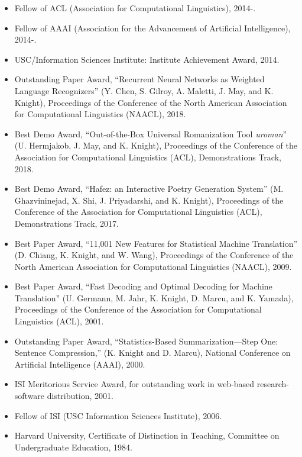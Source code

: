 
\begin{itemize}

\item Fellow of ACL (Association for Computational Linguistics), 2014-.

\item Fellow of AAAI (Association for the Advancement 
of Artificial Intelligence), 2014-.

\item USC/Information Sciences Institute: Institute Achievement Award, 2014.

\item Outstanding Paper Award,
``Recurrent Neural Networks as Weighted Language Recognizers'' (Y. Chen, S. Gilroy, A. Maletti, J. May, and K. Knight), Proceedings of the Conference of the North American Association for Computational Linguistics (NAACL), 2018. 

\item Best Demo Award,
``Out-of-the-Box Universal Romanization Tool {\em uroman}'' (U. Hermjakob,
J. May, and K. Knight),
Proceedings of the Conference of the 
Association for Computational Linguistics (ACL), Demonstrations Track, 2018.

\item Best Demo Award,
``Hafez: an Interactive Poetry Generation System'' (M. Ghazvininejad, X. Shi, 
J. Priyadarshi, and K. Knight), 
Proceedings of the Conference of the 
Association for Computational Linguistics (ACL), Demonstrations Track, 2017.

\item Best Paper Award,
``11,001 New Features for Statistical Machine Translation''
(D. Chiang, K. Knight, and W. Wang),
Proceedings of the Conference of the 
North American Association for Computational Linguistics (NAACL), 2009.

\item Best Paper Award,
``Fast Decoding and Optimal Decoding for Machine Translation''
(U. Germann, M. Jahr, K. Knight, D. Marcu, and K. Yamada),
Proceedings of the Conference of the 
Association for Computational Linguistics (ACL), 2001.

\item Outstanding Paper Award, 
``Statistics-Based Summarization---Step One: Sentence Compression,'' 
(K. Knight and D. Marcu), National Conference on Artificial
Intelligence (AAAI), 2000.  

\item ISI Meritorious Service Award, for outstanding work in web-based 
research-software distribution, 2001.

\item Fellow of ISI (USC Information Sciences Institute), 2006.

\item Harvard University, Certificate of Distinction in Teaching, 
Committee on Undergraduate Education, 1984.

\end{itemize}


